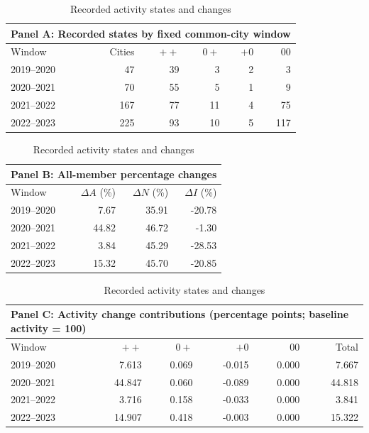\begin{table}[htbp]\centering\small\caption{Recorded activity states and changes}\label{tab:recorded_states}
\begin{tabular}{@{}lrrrrr@{}}\toprule\multicolumn{6}{l}{Panel A: Recorded states by fixed common-city window}\\\midrule
Window & Cities & $++$ & $0+$ & $+0$ & $00$\\
\midrule
2019--2020 & 47 & 39 & 3 & 2 & 3\\
2020--2021 & 70 & 55 & 5 & 1 & 9\\
2021--2022 & 167 & 77 & 11 & 4 & 75\\
2022--2023 & 225 & 93 & 10 & 5 & 117\\
\bottomrule\end{tabular}
\par\medskip\begin{tabular}{@{}lrrr@{}}\toprule\multicolumn{4}{l}{Panel B: All-member percentage changes}\\\midrule
Window & $\Delta A$ (\%) & $\Delta N$ (\%) & $\Delta I$ (\%)\\
\midrule
2019--2020 & 7.67 & 35.91 & -20.78\\
2020--2021 & 44.82 & 46.72 & -1.30\\
2021--2022 & 3.84 & 45.29 & -28.53\\
2022--2023 & 15.32 & 45.70 & -20.85\\
\bottomrule\end{tabular}
\par\medskip\begin{tabular}{@{}lrrrrr@{}}\toprule\multicolumn{6}{l}{Panel C: Activity change contributions (percentage points; baseline activity = 100)}\\\midrule
Window & $++$ & $0+$ & $+0$ & $00$ & Total\\
\midrule
2019--2020 & 7.613 & 0.069 & -0.015 & 0.000 & 7.667\\
2020--2021 & 44.847 & 0.060 & -0.089 & 0.000 & 44.818\\
2021--2022 & 3.716 & 0.158 & -0.033 & 0.000 & 3.841\\
2022--2023 & 14.907 & 0.418 & -0.003 & 0.000 & 15.322\\
\bottomrule\end{tabular}\end{table}
